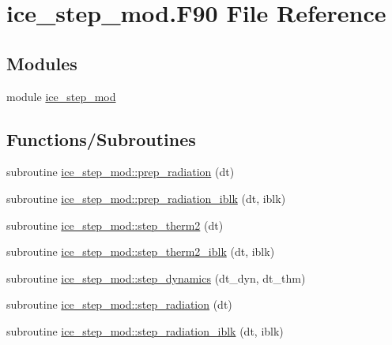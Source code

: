 \hypertarget{ice__step__mod_8F90}{
\section{ice\_\-step\_\-mod.F90 File Reference}
\label{ice__step__mod_8F90}
}
\subsection*{Modules}
\begin{DoxyCompactItemize}
\item 
module \hyperlink{namespaceice__step__mod}{ice\_\-step\_\-mod}
\end{DoxyCompactItemize}
\subsection*{Functions/Subroutines}
\begin{DoxyCompactItemize}
\item 
subroutine \hyperlink{namespaceice__step__mod_a0b4e1b00567ef101191e7c8c27b21829}{ice\_\-step\_\-mod::prep\_\-radiation} (dt)
\item 
subroutine \hyperlink{namespaceice__step__mod_a39289f79dee62dcc8102504d118c616c}{ice\_\-step\_\-mod::prep\_\-radiation\_\-iblk} (dt, iblk)
\item 
subroutine \hyperlink{namespaceice__step__mod_a4f84e9d5e596f23acbbe44ac3b9fdf25}{ice\_\-step\_\-mod::step\_\-therm2} (dt)
\item 
subroutine \hyperlink{namespaceice__step__mod_a81aa72f95f97b932fe2cd47da7c53755}{ice\_\-step\_\-mod::step\_\-therm2\_\-iblk} (dt, iblk)
\item 
subroutine \hyperlink{namespaceice__step__mod_a9b4ebd333313b56f42a75e8456969dd9}{ice\_\-step\_\-mod::step\_\-dynamics} (dt\_\-dyn, dt\_\-thm)
\item 
subroutine \hyperlink{namespaceice__step__mod_a9e4459b869b4b233da16c02d6b92e975}{ice\_\-step\_\-mod::step\_\-radiation} (dt)
\item 
subroutine \hyperlink{namespaceice__step__mod_a9261563c1a6fee389549374e31fb0142}{ice\_\-step\_\-mod::step\_\-radiation\_\-iblk} (dt, iblk)
\end{DoxyCompactItemize}
